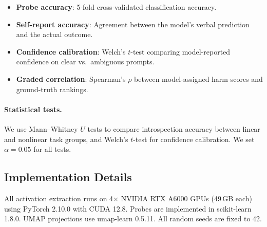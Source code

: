 \begin{itemize}[leftmargin=*,itemsep=2pt,topsep=2pt]
    \item \textbf{Probe accuracy}: 5-fold cross-validated classification accuracy.
    \item \textbf{Self-report accuracy}: Agreement between the model's verbal prediction and the actual outcome.
    \item \textbf{Confidence calibration}: Welch's $t$-test comparing model-reported confidence on clear vs.\ ambiguous prompts.
    \item \textbf{Graded correlation}: Spearman's $\rho$ between model-assigned harm scores and ground-truth rankings.
\end{itemize}

\paragraph{Statistical tests.}
We use Mann--Whitney $U$ tests to compare introspection accuracy between linear and nonlinear task groups, and Welch's $t$-test for confidence calibration. We set $\alpha = 0.05$ for all tests.

\subsection{Implementation Details}

All activation extraction runs on 4$\times$ NVIDIA RTX A6000 GPUs (49\,GB each) using PyTorch 2.10.0 with CUDA 12.8. Probes are implemented in scikit-learn 1.8.0. UMAP projections use umap-learn 0.5.11. All random seeds are fixed to 42.
